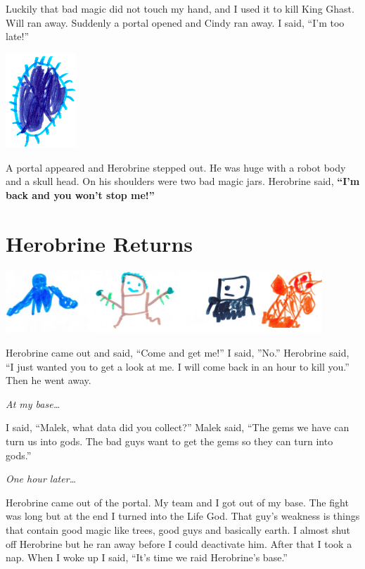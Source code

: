 \documentclass[12pt,oneside]{krantz}
\begin{document}
Luckily that bad magic did not touch my hand, and I used it to kill King
Ghast. Will ran away. Suddenly a portal opened and Cindy ran away. I
said, ``I'm too late!''

\includegraphics[width=1.04167in,height=\textheight]{img/king-ghast/14-portal.jpg}

A portal appeared and Herobrine stepped out. He was huge with a robot
body and a skull head. On his shoulders were two bad magic jars.
Herobrine said, \textbf{``I'm back and you won't stop me!''}

\hypertarget{herobrine-returns}{%
\chapter{Herobrine Returns}\label{herobrine-returns}}

\includegraphics[width=4.6875in,height=\textheight]{img/herobrine-returns/3-gods.jpg}

Herobrine came out and said, ``Come and get me!'' I said, ''No.''
Herobrine said, ``I just wanted you to get a look at me. I will come
back in an hour to kill you.'' Then he went away.

\emph{At my base\ldots{}}

I said, ``Malek, what data did you collect?'' Malek said, ``The gems we
have can turn us into gods. The bad guys want to get the gems so they
can turn into gods.''

\emph{One hour later\ldots{}}

Herobrine came out of the portal. My team and I got out of my base. The
fight was long but at the end I turned into the Life God. That guy's
weakness is things that contain good magic like trees, good guys and
basically earth. I almost shut off Herobrine but he ran away before I
could deactivate him. After that I took a nap. When I woke up I said,
``It's time we raid Herobrine's base.''
\end{document}
